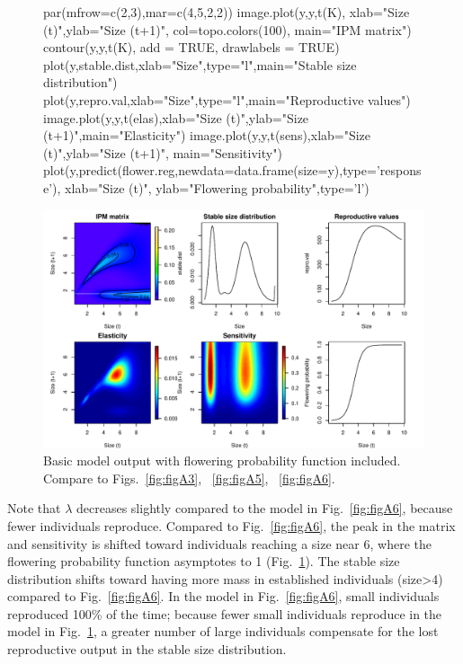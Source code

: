 \documentclass[11pt]{article}
\begin{document}
\begin{enumerate}[(A)]
\begin{figure}[H]
\begin{center}
\begin{Schunk}
\begin{Sinput}
     par(mfrow=c(2,3),mar=c(4,5,2,2)) 
     image.plot(y,y,t(K), xlab="Size (t)",ylab="Size (t+1)",
        col=topo.colors(100), main="IPM matrix")
     contour(y,y,t(K), add = TRUE, drawlabels = TRUE)
     plot(y,stable.dist,xlab="Size",type="l",main="Stable size distribution")
     plot(y,repro.val,xlab="Size",type="l",main="Reproductive values") 
     image.plot(y,y,t(elas),xlab="Size (t)",ylab="Size (t+1)",main="Elasticity")
     image.plot(y,y,t(sens),xlab="Size (t)",ylab="Size (t+1)", main="Sensitivity")
     plot(y,predict(flower.reg,newdata=data.frame(size=y),type='response'),
        xlab="Size (t)", ylab="Flowering probability",type='l')
\end{Sinput}
\end{Schunk}
\includegraphics{IPM_Guide_Appendix_A-fig7}
\caption{Basic model output with flowering probability function included. Compare to Figs.~\ref{fig:figA3}, ~\ref{fig:figA5}, ~\ref{fig:figA6}.}
\label{fig:figA7}
\end{center}
\end{figure}

\end{enumerate}

Note that $\lambda$ decreases slightly compared to the model in Fig.~\ref{fig:figA6}, because fewer individuals reproduce. Compared to Fig.~\ref{fig:figA6}, the peak in the matrix and sensitivity is shifted toward individuals reaching a size near 6, where the flowering probability function asymptotes to 1 (Fig.~\ref{fig:figA7}). The stable size distribution shifts toward having more mass in established individuals (size>4) compared to Fig.~\ref{fig:figA6}. In the model in Fig.~\ref{fig:figA6}, small individuals reproduced 100\% of the time; because fewer small individuals reproduce in the model in Fig.~\ref{fig:figA7}, a greater number of large individuals compensate for the lost reproductive output in the stable size distribution. 
\end{document}
